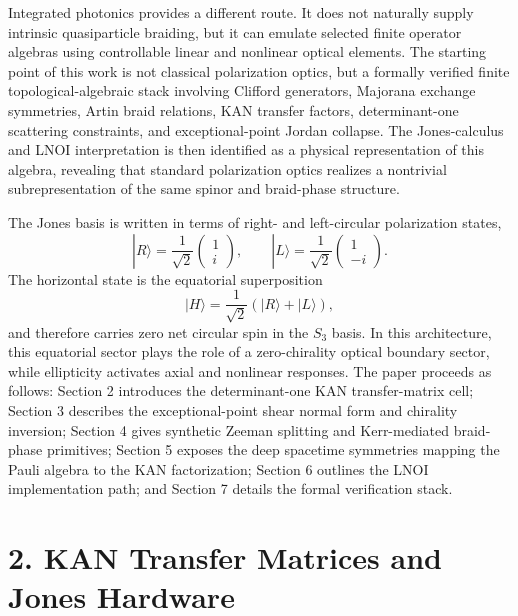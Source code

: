 \documentclass[aps,prl,twocolumn,superscriptaddress,amsmath,amssymb]{revtex4-2}
\begin{document}
Integrated photonics provides a different route. It does not naturally supply intrinsic quasiparticle braiding, but it can emulate selected finite operator algebras using controllable linear and nonlinear optical elements. The starting point of this work is not classical polarization optics, but a formally verified finite topological-algebraic stack involving Clifford generators, Majorana exchange symmetries, Artin braid relations, KAN transfer factors, determinant-one scattering constraints, and exceptional-point Jordan collapse. The Jones-calculus and LNOI interpretation is then identified as a physical representation of this algebra, revealing that standard polarization optics realizes a nontrivial subrepresentation of the same spinor and braid-phase structure.

The Jones basis is written in terms of right- and left-circular polarization states,
\begin{equation}
|R\rangle=\frac{1}{\sqrt{2}}
\begin{pmatrix}
1\\
i
\end{pmatrix},
\qquad
|L\rangle=\frac{1}{\sqrt{2}}
\begin{pmatrix}
1\\
-i
\end{pmatrix}.
\end{equation}
The horizontal state is the equatorial superposition
\begin{equation}
|H\rangle=\frac{1}{\sqrt{2}}(|R\rangle+|L\rangle),
\end{equation}
and therefore carries zero net circular spin in the $S_3$ basis. In this architecture, this equatorial sector plays the role of a zero-chirality optical boundary sector, while ellipticity activates axial and nonlinear responses. The paper proceeds as follows: Section 2 introduces the determinant-one KAN transfer-matrix cell; Section 3 describes the exceptional-point shear normal form and chirality inversion; Section 4 gives synthetic Zeeman splitting and Kerr-mediated braid-phase primitives; Section 5 exposes the deep spacetime symmetries mapping the Pauli algebra to the KAN factorization; Section 6 outlines the LNOI implementation path; and Section 7 details the formal verification stack.

\section{2. KAN Transfer Matrices and Jones Hardware}
\end{document}
